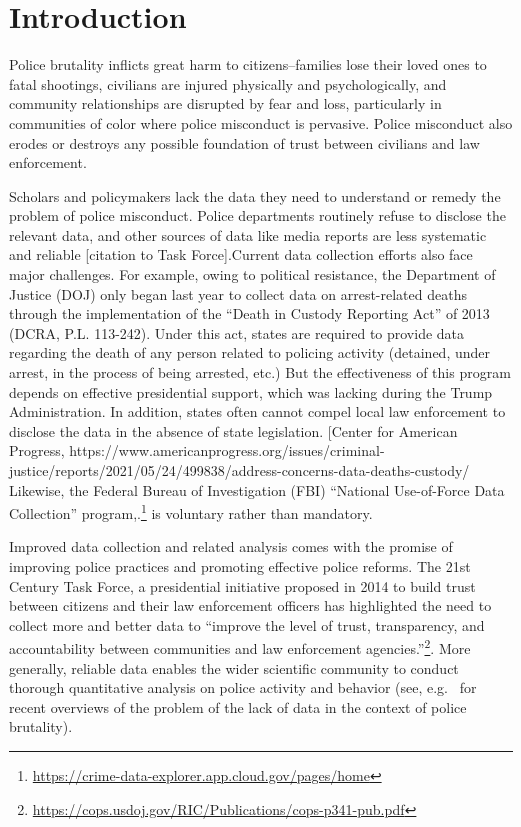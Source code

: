 

\section{Introduction} \label{sec:intro}


Police brutality inflicts great harm to citizens--families lose their loved ones to fatal shootings, civilians are injured physically and psychologically, and community relationships are disrupted by fear and loss, particularly in communities of color where police misconduct is pervasive. Police misconduct also erodes or destroys any possible foundation of trust between civilians and law enforcement. 

Scholars and policymakers lack the data they need to understand or remedy the problem of police misconduct. Police departments routinely refuse to disclose the relevant data, and other sources of data like media reports are less systematic and reliable [citation to Task Force].Current data collection efforts also face major challenges. For example, owing to political resistance, the Department of Justice (DOJ) only began last year to collect data on arrest-related deaths through the implementation of the ``Death in Custody Reporting Act'' of 2013 (DCRA, P.L. 113-242). Under this act, states are required to provide data regarding the death of any person related to policing activity (detained, under arrest, in the process of being arrested, etc.) But the effectiveness of this program depends on effective presidential support, which was lacking during the Trump Administration. In addition, states often cannot compel local law enforcement to disclose the data in the absence of state legislation. [Center for American Progress, https://www.americanprogress.org/issues/criminal-justice/reports/2021/05/24/499838/address-concerns-data-deaths-custody/  Likewise, the Federal Bureau of Investigation (FBI) ``National Use-of-Force Data Collection'' program,.\footnote{\url{https://crime-data-explorer.app.cloud.gov/pages/home}} is voluntary rather than mandatory. 

Improved data collection and related analysis comes with the promise of improving  police practices and promoting effective police reforms. The 21st Century Task Force, a presidential initiative proposed in 2014 to build trust between citizens and their law enforcement officers has highlighted the need to collect more and better data to ``improve the level of trust, transparency, and accountability between communities and law enforcement agencies.''\footnote{\url{https://cops.usdoj.gov/RIC/Publications/cops-p341-pub.pdf}}. More generally, reliable data enables the wider scientific community to conduct thorough quantitative analysis on police activity and behavior (see, e.g.\ \citet{peeples2019data,peeples2020data} for recent overviews of the problem of the lack of data in the context of police brutality).

